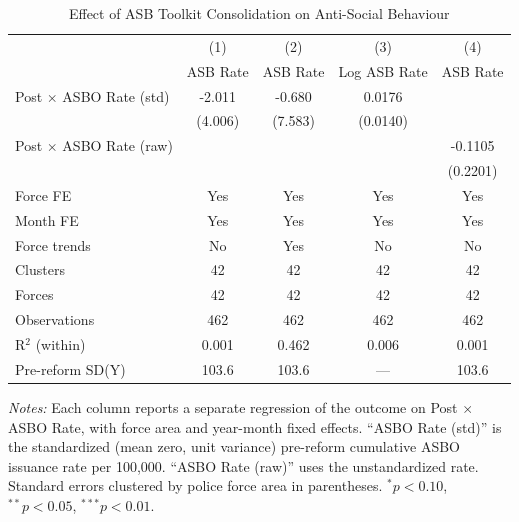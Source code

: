 \begin{table}[htbp]
\centering
\caption{Effect of ASB Toolkit Consolidation on Anti-Social Behaviour}
\label{tab:main}
\begin{threeparttable}
\begin{tabular}{lcccc}
\hline\hline
 & (1) & (2) & (3) & (4) \\
 & ASB Rate & ASB Rate & Log ASB Rate & ASB Rate \\
\hline
Post $\times$ ASBO Rate (std) & -2.011 & -0.680 & 0.0176 & \\
 & (4.006) & (7.583) & (0.0140) & \\
Post $\times$ ASBO Rate (raw) & & & & -0.1105 \\
 & & & & (0.2201) \\
\hline
Force FE & Yes & Yes & Yes & Yes \\
Month FE & Yes & Yes & Yes & Yes \\
Force trends & No & Yes & No & No \\
Clusters & 42 & 42 & 42 & 42 \\
Forces & 42 & 42 & 42 & 42 \\
Observations & 462 & 462 & 462 & 462 \\
R$^2$ (within) & 0.001 & 0.462 & 0.006 & 0.001 \\
Pre-reform SD(Y) & 103.6 & 103.6 & --- & 103.6 \\
\hline\hline
\end{tabular}
\begin{tablenotes}[flushleft]\small
\item \textit{Notes:} Each column reports a separate regression of the outcome on Post $\times$ ASBO Rate, with force area and year-month fixed effects. ``ASBO Rate (std)'' is the standardized (mean zero, unit variance) pre-reform cumulative ASBO issuance rate per 100,000. ``ASBO Rate (raw)'' uses the unstandardized rate. Standard errors clustered by police force area in parentheses. $^{*}p<0.10$, $^{**}p<0.05$, $^{***}p<0.01$.
\end{tablenotes}
\end{threeparttable}
\end{table}
